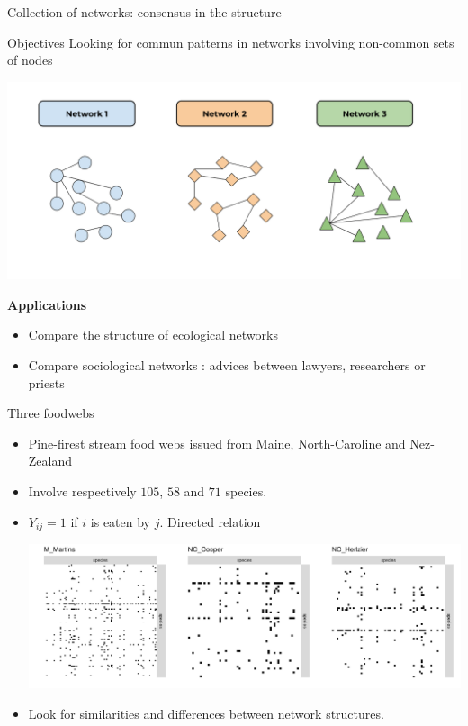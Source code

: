 \documentclass[compress,10pt]{beamer}
\begin{document}
\begin{frame}{Collection of networks: consensus in the structure}
\begin{block}{Objectives}
Looking for  commun patterns in networks involving non-common sets of nodes
\end{block}
\begin{center}
\includegraphics[width = 0.7\linewidth]{plots/ConsensusNetwork}
\end{center}
\textbf{Applications}
\begin{itemize}
 \item Compare the structure of ecological networks
 \item Compare sociological networks : advices between lawyers, researchers  or priests
\end{itemize}

\end{frame}




\begin{frame}{Three foodwebs }
\begin{itemize}
\item Pine-firest stream food webs issued from Maine, North-Caroline and Nez-Zealand  {\footnotesize \color{dgreen} \cite{thompson2003impacts}}
\item Involve respectively $105$, $58$ and  $71$ species.
\item $Y_{ij}=1$ if $i$ is eaten by $j$.  Directed relation
\begin{center}
    \includegraphics[width = \textwidth]{plots/rawdata}
\end{center}

\item Look for similarities and differences between network structures. 
\end{itemize}
\end{frame}
\end{document}
